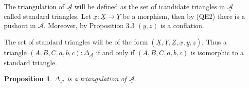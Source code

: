 \documentclass[12pt]{article}
\newtheorem{prop}[theorem]{Proposition}
\theoremstyle{definition}
\theoremstyle{remark}
\begin{document}
            The triangulation of $\underline{\mathcal{A}}$ will be defined as the set of icandidate triangles in $\underline{\mathcal{A}}$ called standard triangles. Let $\underline{x}:\underline{X}\rightarrow\underline{Y}$ be a morphism, then by (QE2) there is a pushout in $\mathcal{A}$. Moreover, by Proposition 3.3 $(y,z)$ is a conflation.

            \begin{minipage}[c]{0.6\textwidth}
                \begin{center}
                \end{center}
            \end{minipage}
            \begin{minipage}[c]{0.4\textwidth}
                The set of standard triangles will be of the form $(\underline{X},\underline{Y},\underline{Z},\underline{x},\underline{y},\underline{z})$. Thus a triangle $(A,B,C,a,b,c):\Delta_{\underline{\mathcal{A}}}$ if and only if $(A,B,C,a,b,c)$ is isomorphic to a standard triangle.
            \end{minipage}

            \begin{prop}
                $\Delta_{\underline{\mathcal{A}}}$ is a triangulation of $\underline{\mathcal{A}}$.
            \end{prop}
\end{document}

